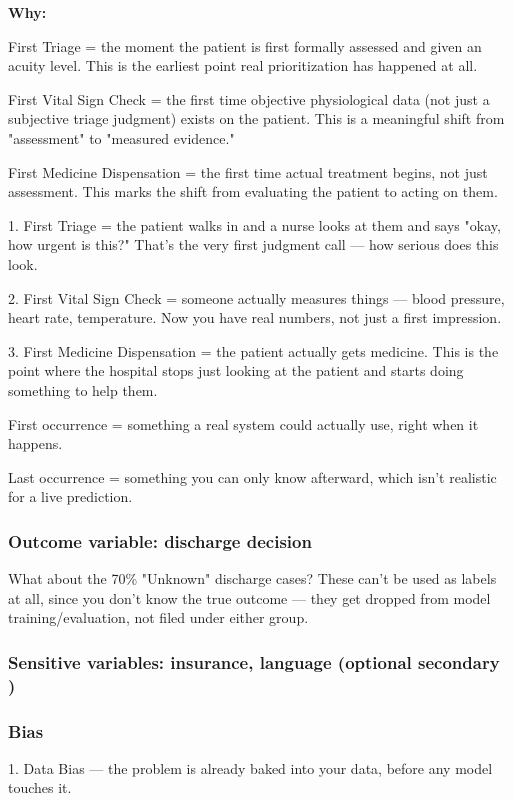 \documentclass[authoryear,preprint,12pt]{elsarticle}
\begin{document}
\textbf{Why:}

First Triage = the moment the patient is first formally assessed and given an acuity level. This is the earliest point real prioritization has happened at all.

First Vital Sign Check = the first time objective physiological data (not just a subjective triage judgment) exists on the patient. This is a meaningful shift from "assessment" to "measured evidence."

First Medicine Dispensation = the first time actual treatment begins, not just assessment. This marks the shift from evaluating the patient to acting on them.

1. First Triage = the patient walks in and a nurse looks at them and says "okay, how urgent is this?" That's the very first judgment call — how serious does this look.

2. First Vital Sign Check = someone actually measures things — blood pressure, heart rate, temperature. Now you have real numbers, not just a first impression.

3. First Medicine Dispensation = the patient actually gets medicine. This is the point where the hospital stops just looking at the patient and starts doing something to help them.

First occurrence = something a real system could actually use, right when it happens.

Last occurrence = something you can only know afterward, which isn't realistic for a live prediction.

\subsubsection{\textbf{Outcome variable: discharge decision}}
What about the 70\% "Unknown" discharge cases? These can't be used as labels at all, since you don't know the true outcome — they get dropped from model training/evaluation, not filed under either group.

\subsubsection{\textbf{Sensitive variables: insurance, language (optional secondary ) }}

\subsubsection{\textbf{Bias}}
1. Data Bias — the problem is already baked into your data, before any model touches it.
\end{document}
